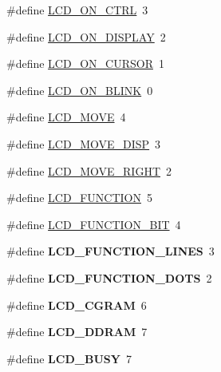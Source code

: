 \begin{DoxyCompactItemize}
\#define \hyperlink{group__ex4__lcd_ga98ea2185740c931ae4d872059dd489b1}{L\-C\-D\-\_\-\-O\-N\-\_\-\-C\-T\-R\-L}~3
\item 
\#define \hyperlink{group__ex4__lcd_gae84f634b0a1661c4d5bbaafd9397732a}{L\-C\-D\-\_\-\-O\-N\-\_\-\-D\-I\-S\-P\-L\-A\-Y}~2
\item 
\#define \hyperlink{group__ex4__lcd_ga47638b5ebbaec9600a0ebf9a55caf802}{L\-C\-D\-\_\-\-O\-N\-\_\-\-C\-U\-R\-S\-O\-R}~1
\item 
\#define \hyperlink{group__ex4__lcd_ga5d76592a978537acee615098ce4d80f5}{L\-C\-D\-\_\-\-O\-N\-\_\-\-B\-L\-I\-N\-K}~0
\item 
\#define \hyperlink{group__ex4__lcd_ga3f4f758b80fcfa6c9e4db58e2515c78a}{L\-C\-D\-\_\-\-M\-O\-V\-E}~4
\item 
\#define \hyperlink{group__ex4__lcd_gaaddc2afa9a02bfa748950f2c1e6a204d}{L\-C\-D\-\_\-\-M\-O\-V\-E\-\_\-\-D\-I\-S\-P}~3
\item 
\#define \hyperlink{group__ex4__lcd_ga97cdb19acf109ad52ab4994d2ad02cee}{L\-C\-D\-\_\-\-M\-O\-V\-E\-\_\-\-R\-I\-G\-H\-T}~2
\item 
\#define \hyperlink{group__ex4__lcd_ga50de1697f1da8ab075a6b4d7aeace64e}{L\-C\-D\-\_\-\-F\-U\-N\-C\-T\-I\-O\-N}~5
\item 
\#define \hyperlink{group__ex4__lcd_ga91d15d8e3008f6cb141406a8b5d0d3c0}{L\-C\-D\-\_\-\-F\-U\-N\-C\-T\-I\-O\-N\-\_\-B\-I\-T}~4
\item 
\hypertarget{group__ex4__lcd_ga6c24806bed18d565917165caa3475463}{\#define {\bfseries L\-C\-D\-\_\-\-F\-U\-N\-C\-T\-I\-O\-N\-\_\-L\-I\-N\-E\-S}~3}\label{group__ex4__lcd_ga6c24806bed18d565917165caa3475463}

\item 
\hypertarget{group__ex4__lcd_ga48de81358277fe4f2810c2b82f90397e}{\#define {\bfseries L\-C\-D\-\_\-\-F\-U\-N\-C\-T\-I\-O\-N\-\_\-D\-O\-T\-S}~2}\label{group__ex4__lcd_ga48de81358277fe4f2810c2b82f90397e}

\item 
\hypertarget{group__ex4__lcd_ga3b38de74c362be1781fef1136aa9684c}{\#define {\bfseries L\-C\-D\-\_\-\-C\-G\-R\-A\-M}~6}\label{group__ex4__lcd_ga3b38de74c362be1781fef1136aa9684c}

\item 
\hypertarget{group__ex4__lcd_gae54acf3ccc45b7d6be334a03627740c6}{\#define {\bfseries L\-C\-D\-\_\-\-D\-D\-R\-A\-M}~7}\label{group__ex4__lcd_gae54acf3ccc45b7d6be334a03627740c6}

\item 
\hypertarget{group__ex4__lcd_gac8dd1658e235f174d1cabae5c438943d}{\#define {\bfseries L\-C\-D\-\_\-\-B\-U\-S\-Y}~7}\label{group__ex4__lcd_gac8dd1658e235f174d1cabae5c438943d}


\end{DoxyCompactItemize}
